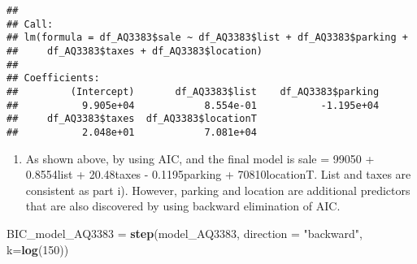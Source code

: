 \documentclass[
]{article}
\newenvironment{Shaded}{\begin{snugshade}}{\end{snugshade}}
\newcommand{\DataTypeTok}[1]{\textcolor[rgb]{0.13,0.29,0.53}{#1}}
\newcommand{\DecValTok}[1]{\textcolor[rgb]{0.00,0.00,0.81}{#1}}
\newcommand{\KeywordTok}[1]{\textcolor[rgb]{0.13,0.29,0.53}{\textbf{#1}}}
\newcommand{\NormalTok}[1]{#1}
\newcommand{\StringTok}[1]{\textcolor[rgb]{0.31,0.60,0.02}{#1}}
\providecommand{\tightlist}{%
  \setlength{\itemsep}{0pt}\setlength{\parskip}{0pt}}
\begin{document}
\begin{verbatim}
## 
## Call:
## lm(formula = df_AQ3383$sale ~ df_AQ3383$list + df_AQ3383$parking + 
##     df_AQ3383$taxes + df_AQ3383$location)
## 
## Coefficients:
##         (Intercept)       df_AQ3383$list    df_AQ3383$parking  
##           9.905e+04            8.554e-01           -1.195e+04  
##     df_AQ3383$taxes  df_AQ3383$locationT  
##           2.048e+01            7.081e+04
\end{verbatim}

\begin{enumerate}
\def\labelenumi{\roman{enumi})}
\setcounter{enumi}{1}
\tightlist
\item
  As shown above, by using AIC, and the final model is sale = 99050 +
  0.8554list + 20.48taxes - 0.1195parking + 70810locationT. List and
  taxes are consistent as part i). However, parking and location are
  additional predictors that are also discovered by using backward
  elimination of AIC.
\end{enumerate}

\begin{Shaded}
\begin{Highlighting}[]
\NormalTok{BIC_model_AQ3383 =}\StringTok{ }\KeywordTok{step}\NormalTok{(model_AQ3383, }\DataTypeTok{direction =} \StringTok{"backward"}\NormalTok{, }\DataTypeTok{k=}\KeywordTok{log}\NormalTok{(}\DecValTok{150}\NormalTok{))}
\end{Highlighting}
\end{Shaded}
\end{document}
